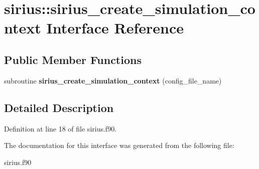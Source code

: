 \hypertarget{interfacesirius_1_1sirius__create__simulation__context}{}\section{sirius\+:\+:sirius\+\_\+create\+\_\+simulation\+\_\+context Interface Reference}
\label{interfacesirius_1_1sirius__create__simulation__context}
\subsection*{Public Member Functions}
\begin{DoxyCompactItemize}
\item 
\hypertarget{interfacesirius_1_1sirius__create__simulation__context_a34f4943b6d1ade6de31048668ac670a1}{}subroutine {\bfseries sirius\+\_\+create\+\_\+simulation\+\_\+context} (config\+\_\+file\+\_\+name)\label{interfacesirius_1_1sirius__create__simulation__context_a34f4943b6d1ade6de31048668ac670a1}

\end{DoxyCompactItemize}


\subsection{Detailed Description}


Definition at line 18 of file sirius.\+f90.



The documentation for this interface was generated from the following file\+:\begin{DoxyCompactItemize}
\item 
sirius.\+f90\end{DoxyCompactItemize}
